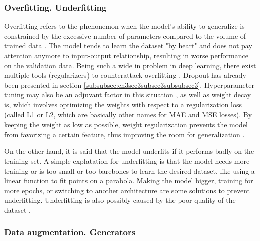 \subsubsection{Overfitting. Underfitting}
\label{subsubsec:ch3sec3subsec7subsubsec5}

Overfitting refers to the phenonemon when the model's ability to generalize is constrained by the excessive number of parameters compared to the volume of trained data \cite{overfitting}. The model tends to learn the dataset "by heart" and does not pay attention anymore to input-output relationship, resulting in worse performance on the validation data. Being such a wide in problem in deep learning, there exist multiple tools (regularizers) to counterattack overfitting \cite{overfitting}. Dropout has already been presented in section \ref{subsubsec:ch3sec3subsec3subsubsec3}.
Hyperparameter tuning may also be an adjuvant factor in this situation \cite{overfitting}, as well as weight decay is, which involves optimizing the weights with respect to a regularization loss (called L1 or L2, which are basically other names for MAE and MSE losses). By keeping the weight as low as possible, weight regularization prevents the model from favorizing a certain feature, thus improving the room for generalization \cite{weight_decay}.

On the other hand, it is said that the model underfits if it performs badly on the training set. A simple explatation for underfitting is that the model needs more training or is too small or too barebones to learn the desired dataset, like using a linear function to fit points on a parabola. Making the model bigger, training for more epochs, or switching to another architecture are some solutions to prevent underfitting. Underfitting is also possibly caused by the poor quality of the dataset \cite{overunderfitting}. 

\subsubsection{Data augmentation. Generators}
\label{subsubsec:ch3sec3subsec7subsubsec2}

